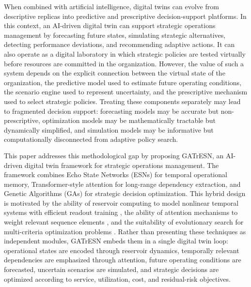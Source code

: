 \documentclass[apajournal,article,submit,pdftex,moreauthors]{Definitions/mdpi}
\begin{document}
When combined with artificial intelligence, digital twins can evolve from descriptive replicas into predictive and prescriptive decision-support platforms. In this context, an AI-driven digital twin can support strategic operations management by forecasting future states, simulating strategic alternatives, detecting performance deviations, and recommending adaptive actions. It can also operate as a digital laboratory in which strategic policies are tested virtually before resources are committed in the organization. However, the value of such a system depends on the explicit connection between the virtual state of the organization, the predictive model used to estimate future operating conditions, the scenario engine used to represent uncertainty, and the prescriptive mechanism used to select strategic policies. Treating these components separately may lead to fragmented decision support: forecasting models may be accurate but non-prescriptive, optimization models may be mathematically tractable but dynamically simplified, and simulation models may be informative but computationally disconnected from adaptive policy search.

This paper addresses this methodological gap by proposing GATrESN, an AI-driven digital twin framework for strategic operations management. The framework combines Echo State Networks (ESNs) for temporal operational memory, Transformer-style attention for long-range dependency extraction, and Genetic Algorithms (GAs) for strategic decision optimization. This hybrid design is motivated by the ability of reservoir computing to model nonlinear temporal systems with efficient readout training \citep{jaeger2004harnessing,lukosevicius2009reservoir}, the ability of attention mechanisms to weight relevant sequence elements \citep{bahdanau2014neural,vaswani2017attention}, and the suitability of evolutionary search for multi-criteria optimization problems \citep{deb2002fast}. Rather than presenting these techniques as independent modules, GATrESN embeds them in a single digital twin loop: operational states are encoded through reservoir dynamics, temporally relevant dependencies are emphasized through attention, future operating conditions are forecasted, uncertain scenarios are simulated, and strategic decisions are optimized according to service, utilization, cost, and residual-risk objectives.
\end{document}
